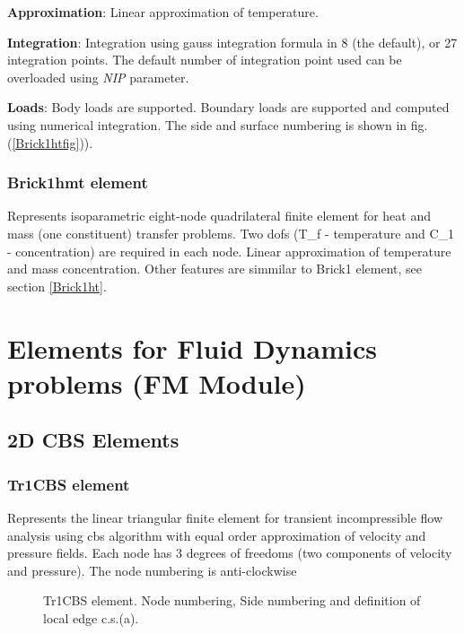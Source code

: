 \documentclass[12pt,dvips]{article}
\newcommand{\descitem}[1]{{\noindent \bf #1}:}
\newcommand{\param}[1]{{\it #1}}
\begin{document}
\descitem{Approximation} Linear approximation of temperature.

\descitem{Integration}
Integration using gauss integration formula
in 8 (the default), or 27 integration points. The default number of
integration point used can be overloaded using \param{NIP} parameter.

\descitem{Loads} Body loads are supported. Boundary loads are
supported and computed using numerical integration. The side and
surface numbering is shown in fig. (\ref{Brick1htfig})).

\subsubsection{Brick1hmt element}
Represents isoparametric eight-node quadrilateral finite element for
heat and mass (one constituent) transfer problems. 
Two dofs (T\_f - temperature and C\_1 - concentration) are required in
each node. Linear approximation of temperature and mass concentration.
Other features are simmilar to Brick1 element, see section \ref{Brick1ht}.

\section{Elements for Fluid Dynamics problems (FM Module)}
\subsection{2D CBS Elements}
\subsubsection{Tr1CBS element}
\label{Tr1CBS}
Represents the linear triangular finite element for transient
incompressible flow analysis using cbs algorithm with equal order
approximation of velocity and pressure fields. Each node has 3 degrees
of freedoms (two components of velocity and pressure).
The node numbering is anti-clockwise

\begin{figure}[tb]
\begin{center}\end{center}
\caption{Tr1CBS element. Node numbering, Side numbering and
definition of local edge c.s.(a).}
\label{Tr1CBSfig}
\end{figure}
\end{document}
